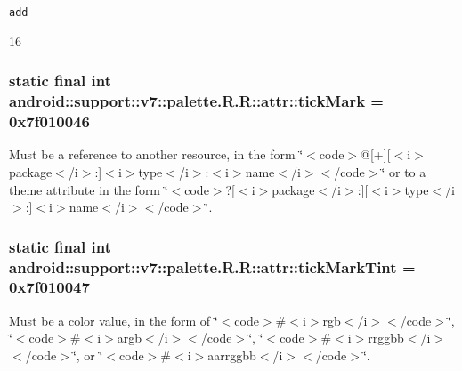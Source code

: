 {\tt add}

16\hypertarget{classandroid_1_1support_1_1v7_1_1palette_1_1_r_1_1attr_0fac2029a84f12c8bd4f9d56369bb25a}{
\subsubsection[{tickMark}]{\setlength{\rightskip}{0pt plus 5cm}static final int android::support::v7::palette.R.R::attr::tickMark = 0x7f010046}}
\label{classandroid_1_1support_1_1v7_1_1palette_1_1_r_1_1attr_0fac2029a84f12c8bd4f9d56369bb25a}


Must be a reference to another resource, in the form \char`\"{}$<$code$>$@\mbox{[}+\mbox{]}\mbox{[}$<$i$>$package$<$/i$>$:\mbox{]}$<$i$>$type$<$/i$>$:$<$i$>$name$<$/i$>$$<$/code$>$\char`\"{} or to a theme attribute in the form \char`\"{}$<$code$>$?\mbox{[}$<$i$>$package$<$/i$>$:\mbox{]}\mbox{[}$<$i$>$type$<$/i$>$:\mbox{]}$<$i$>$name$<$/i$>$$<$/code$>$\char`\"{}. \hypertarget{classandroid_1_1support_1_1v7_1_1palette_1_1_r_1_1attr_4bcf5eb0d8bda060ae70e05cb5bc44f0}{
\subsubsection[{tickMarkTint}]{\setlength{\rightskip}{0pt plus 5cm}static final int android::support::v7::palette.R.R::attr::tickMarkTint = 0x7f010047}}
\label{classandroid_1_1support_1_1v7_1_1palette_1_1_r_1_1attr_4bcf5eb0d8bda060ae70e05cb5bc44f0}


Must be a \hyperlink{classandroid_1_1support_1_1v7_1_1palette_1_1_r_1_1color}{color} value, in the form of \char`\"{}$<$code$>$\#$<$i$>$rgb$<$/i$>$$<$/code$>$\char`\"{}, \char`\"{}$<$code$>$\#$<$i$>$argb$<$/i$>$$<$/code$>$\char`\"{}, \char`\"{}$<$code$>$\#$<$i$>$rrggbb$<$/i$>$$<$/code$>$\char`\"{}, or \char`\"{}$<$code$>$\#$<$i$>$aarrggbb$<$/i$>$$<$/code$>$\char`\"{}. 

